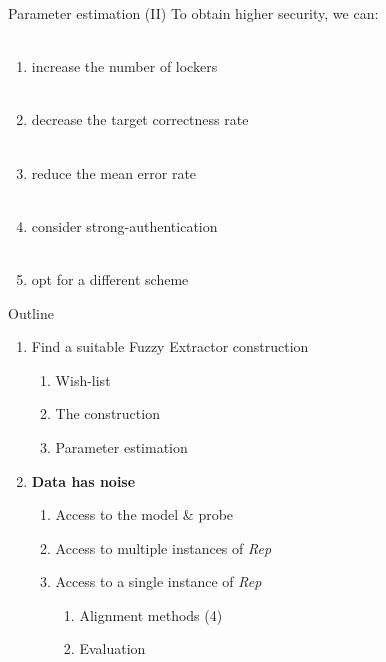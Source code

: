 \documentclass{beamer}
\def\fe{Fuzzy Extractor\xspace}
\newcommand{\rep}{\textit{Rep}\xspace}
\begin{document}
\begin{frame}{Parameter estimation (II)}
To obtain higher security, we can:\\~
\begin{enumerate}
    \item increase the number of lockers\label{it:sec1}\\~\pause
    \item decrease the target correctness rate\label{it:sec11}\\~\pause
    \item reduce the mean error rate\label{it:sec2}\\~\pause
    \item consider strong-authentication \label{it:sec22}\\~\pause
    \item opt for a different scheme\label{it:sec3}
\end{enumerate}
  
\end{frame}

\begin{frame}{Outline}
   \begin{enumerate}
   \item Find a suitable \fe construction
\begin{enumerate}
    \item Wish-list
    \item The construction
    \item Parameter estimation\\
\end{enumerate}
   \item \textbf{Data has noise}
   \begin{enumerate}
       \item Access to the model \& probe
       \item Access to multiple instances of \rep
       \item Access to a single instance of \rep
        \begin{enumerate}
            \item Alignment methods (4)
            \item Evaluation
        \end{enumerate}
   \end{enumerate}    
\end{enumerate} 
\end{frame}
\end{document}
